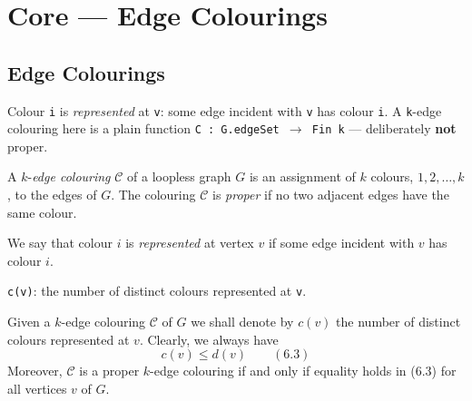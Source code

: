 \section{Core --- Edge Colourings}
\subsection{Edge Colourings}


\begin{definition}
\label{SimpleGraph.IsRepresentedAt}
\leanok
Colour \texttt{i} is \emph{represented} at \texttt{v}: some edge incident with
\texttt{v} has colour \texttt{i}. A \texttt{k}-edge colouring here is a plain function
\texttt{C : G.edgeSet $\to$ Fin k} --- deliberately \textbf{not} proper.

A $k$-\emph{edge colouring} $\mathscr{C}$ of a loopless graph $G$ is an assignment of
$k$ colours, $1, 2, \ldots, k$, to the edges of $G$. The colouring $\mathscr{C}$ is
\emph{proper} if no two adjacent edges have the same colour.

We say that colour $i$ is \emph{represented} at vertex $v$ if some edge incident with
$v$ has colour $i$.
\end{definition}

\begin{definition}
\label{SimpleGraph.numColoursAt}
\leanok
{}
\texttt{c(v)}: the number of distinct colours represented at \texttt{v}.

Given a $k$-edge colouring $\mathscr{C}$ of $G$ we shall denote by $c(v)$ the number of
distinct colours represented at $v$. Clearly, we always have \[c(v) \le d(v) \qquad
(6.3)\] Moreover, $\mathscr{C}$ is a proper $k$-edge colouring if and only if equality
holds in (6.3) for all vertices $v$ of $G$.
\end{definition}

